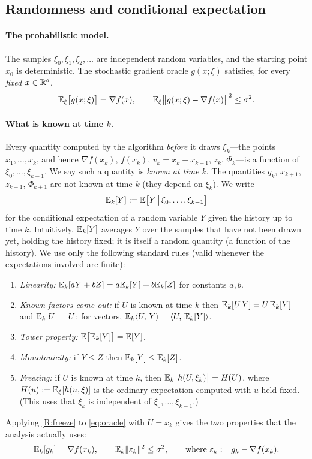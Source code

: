 \subsection{Randomness and conditional expectation}\label{sec:conditional}

\paragraph{The probabilistic model.} The samples $\xi_0,\xi_1,\xi_2,\dots$ are independent
random variables, and the starting point $x_0$ is deterministic. The stochastic gradient
oracle $g(x;\xi)$ satisfies, for every \emph{fixed} $x\in\mathbb{R}^d$,
\begin{equation}\label{eq:oracle}
  \mathbb{E}_\xi\bigl[g(x;\xi)\bigr]=\nabla f(x),\qquad
  \mathbb{E}_\xi\bigl\lVert g(x;\xi)-\nabla f(x)\bigr\rVert^2\le\sigma^2 .
\end{equation}

\paragraph{What is known at time $k$.} Every quantity computed by the algorithm
\emph{before} it draws $\xi_k$---the points $x_1,\dots,x_k$, and hence $\nabla f(x_k)$,
$f(x_k)$, $v_k=x_k-x_{k-1}$, $z_k$, $\Phi_k$---is a function of $\xi_0,\dots,\xi_{k-1}$.
We say such a quantity is \emph{known at time $k$}. The quantities $g_k$, $x_{k+1}$,
$z_{k+1}$, $\Phi_{k+1}$ are not known at time $k$ (they depend on $\xi_k$). We write
\[
  \mathbb{E}_k[Y]:=\mathbb{E}\bigl[Y\,\big|\,\xi_0,\dots,\xi_{k-1}\bigr]
\]
for the conditional expectation of a random variable $Y$ given the history up to time $k$.
Intuitively, $\mathbb{E}_k[Y]$ averages $Y$ over the samples that have not been drawn yet, holding
the history fixed; it is itself a random quantity (a function of the history). We use only
the following standard rules (valid whenever the expectations involved are finite):
\begin{enumerate}[label=\textup{(R\arabic*)},leftmargin=3.2em]
\item\label{R:lin} \emph{Linearity:} $\mathbb{E}_k[aY+bZ]=a\mathbb{E}_k[Y]+b\mathbb{E}_k[Z]$ for constants $a,b$.
\item\label{R:known} \emph{Known factors come out:} if $U$ is known at time $k$ then
  $\mathbb{E}_k[U\,Y]=U\,\mathbb{E}_k[Y]$ and $\mathbb{E}_k[U]=U$; for vectors, $\mathbb{E}_k\langle U,\, Y\rangle=\langle U,\, \mathbb{E}_k[Y]\rangle$.
\item\label{R:tower} \emph{Tower property:} $\mathbb{E}\bigl[\mathbb{E}_k[Y]\bigr]=\mathbb{E}[Y]$.
\item\label{R:mono} \emph{Monotonicity:} if $Y\le Z$ then $\mathbb{E}_k[Y]\le\mathbb{E}_k[Z]$.
\item\label{R:freeze} \emph{Freezing:} if $U$ is known at time $k$, then
  $\mathbb{E}_k\bigl[h(U,\xi_k)\bigr]=H(U)$, where $H(u):=\mathbb{E}_\xi[h(u,\xi)]$ is the ordinary
  expectation computed with $u$ held fixed. (This uses that $\xi_k$ is independent of
  $\xi_0,\dots,\xi_{k-1}$.)
\end{enumerate}
Applying \ref{R:freeze} to \eqref{eq:oracle} with $U=x_k$ gives the two properties that
the analysis actually uses:
\begin{equation}\label{eq:cond-oracle}
  \mathbb{E}_k[g_k]=\nabla f(x_k),\qquad \mathbb{E}_k\lVert \varepsilon_k\rVert^2\le\sigma^2,
  \qquad\text{where }\varepsilon_k:=g_k-\nabla f(x_k).
\end{equation}

